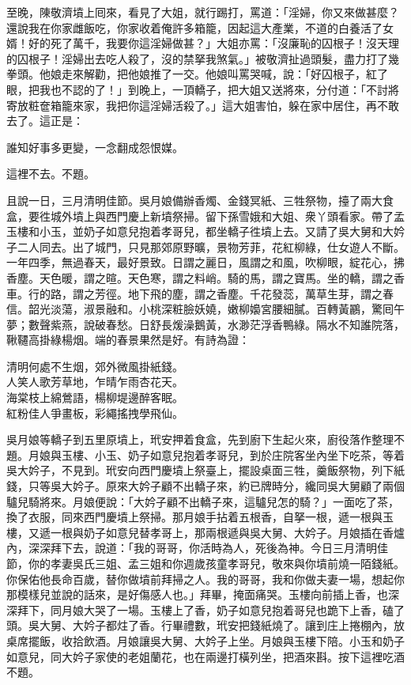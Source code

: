 至晚，陳敬濟墳上囘來，看見了大姐，就行踢打，罵道：「淫婦，你又來做甚麼？還說我在你家雌飯吃，你家收着俺許多箱籠，因起這大產業，不道的白養活了女婿！好的死了萬千，我要你這淫婦做甚？」大姐亦罵：「沒廉恥的囚根子！沒天理的囚根子！淫婦出去吃人殺了，沒的禁拏我煞氣。」被敬濟扯過頭髮，盡力打了幾拳頭。他娘走來解勸，把他娘推了一交。他娘叫罵哭喊，說：「好囚根子，紅了眼，把我也不認的了！」到晚上，一頂轎子，把大姐又送將來，分付道：「不討將寄放粧奩箱籠來家，我把你這淫婦活殺了。」{}這大姐害怕，躲在家中居住，再不敢去了。這正是：

\begin{myquote}
誰知好事多更變，一念翻成怨恨媒。
\end{myquote}

這裡不去。不題。

且說一日，三月清明佳節。吳月娘備辦香燭、金錢冥紙、三牲祭物，擡了兩大食盒，要徃城外墳上與西門慶上新墳祭掃。留下孫雪娥和大姐、衆丫頭看家。帶了孟玉樓和小玉，並奶子如意兒抱着孝哥兒，都坐轎子徃墳上去。又請了吳大舅和大妗子二人同去。出了城門，只見那郊原野曠，景物芳菲，花紅柳綠，仕女遊人不斷。一年四季，無過春天，最好景致。{}日謂之麗日，風謂之和風，吹柳眼，綻花心，拂香塵。天色暖，謂之暄。天色寒，謂之料峭。騎的馬，謂之寶馬。坐的轎，謂之香車。行的路，謂之芳徑。地下飛的塵，謂之香塵。千花發蕊，萬草生芽，謂之春信。韶光淡蕩，淑景融和。小桃深粧臉妖嬈，嫩柳嬝宮腰細膩。百轉黃鸝，驚囘午夢；數聲紫燕，說破春愁。日舒長煖澡鵝黃，水渺茫浮香鴨綠。隔水不知誰院落，鞦韆高掛綠楊烟。端的春景果然是好。有詩為證：

\begin{myquote}
清明何處不生烟，郊外微風掛紙錢。\\人笑人歌芳草地，乍晴乍雨杏花天。\\海棠枝上綿鶯語，楊柳堤邊醉客眠。\\紅粉佳人爭畫板，彩繩搖拽學飛仙。
\end{myquote}

吳月娘等轎子到五里原墳上，玳安押着食盒，先到廚下生起火來，{}廚役落作整理不題。月娘與玉樓、小玉、奶子如意兒抱着孝哥兒，到於庄院客坐內坐下吃茶，等着吳大妗子，不見到。玳安向西門慶墳上祭臺上，擺設桌面三牲，羹飯祭物，列下紙錢，只等吳大妗子。原來大妗子顧不出轎子來，約已牌時分，纔同吳大舅顧了兩個驢兒騎將來。{}月娘便說：「大妗子顧不出轎子來，這驢兒怎的騎？」一面吃了茶，換了衣服，同來西門慶墳上祭掃。那月娘手拈着五根香，自拏一根，遞一根與玉樓，又遞一根與奶子如意兒替孝哥上，那兩根遞與吳大舅、大妗子。月娘插在香爐內，深深拜下去，說道：「我的哥哥，你活時為人，死後為神。今日三月清明佳節，你的孝妻吳氏三姐、孟三姐和你週歲孩童孝哥兒，敬來與你墳前燒一陌錢紙。你保佑他長命百歲，替你做墳前拜掃之人。我的哥哥，我和你做夫妻一場，想起你那模樣兒並說的話來，是好傷感人也。」拜畢，掩面痛哭。玉樓向前插上香，也深深拜下，同月娘大哭了一場。玉樓上了香，奶子如意兒抱着哥兒也跪下上香，磕了頭。吳大舅、大妗子都炷了香。行畢禮數，玳安把錢紙燒了。讓到庄上捲棚內，放桌席擺飯，收拾飲酒。月娘讓吳大舅、大妗子上坐。月娘與玉樓下陪。小玉和奶子如意兒，同大妗子家使的老姐蘭花，也在兩邊打橫列坐，把酒來斟。按下這裡吃酒不題。

